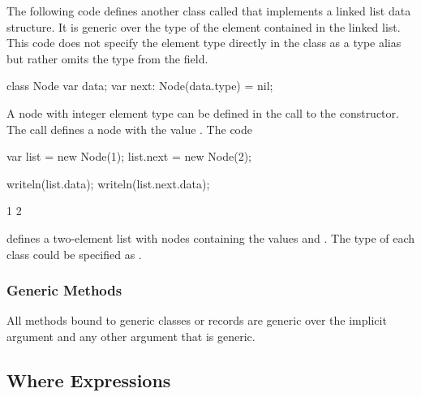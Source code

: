 \begin{example}
The following code defines another class called  that
implements a linked list data structure.  It is generic over the type
of the element contained in the linked list.  This code does not
specify the element type directly in the class as a type alias but
rather omits the type from the  field.
\begin{chapelpre}
\end{chapelpre}
\begin{chapel}
class Node {
  var data;
  var next: Node(data.type) = nil;
}
\end{chapel}
A node with integer element type can be defined in the call to the
constructor.  The call  defines a node with the
value .  The code
\begin{chapel}
var list = new Node(1);
list.next = new Node(2);
\end{chapel}
\begin{chapelpost}
writeln(list.data);
writeln(list.next.data);
\end{chapelpost}
\begin{chapeloutput}
1
2
\end{chapeloutput}
defines a two-element list with nodes containing the values 
and .  The type of each class could be specified
as .
\end{example}

\subsubsection{Generic Methods}
\label{Generic_Methods}

All methods bound to generic classes or records are generic over the
implicit  argument and any other argument that is generic.

\subsection{Where Expressions}
\label{Where_Expressions}


